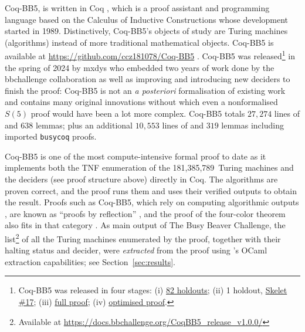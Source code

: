 \documentclass[sigconf,screen]{acmart}
\theoremstyle{definition} %
\numberwithin{equation}{section}
\theoremstyle{definition} %
\newcommand{\BBtheFifthTNF}{181{,}385{,}789}
\newcommand{\CoqBB}{Coq-BB5\xspace}
\begin{document}
\CoqBB, is written in Coq \cite{the_coq_development_team_2024_14542673}, which is a proof assistant and programming language based on the Calculus of Inductive Constructions \cite{CoC} whose development started in 1989. Distinctively, \CoqBB's objects of study are Turing machines (\ie algorithms) instead of more traditional mathematical objects. \CoqBB is available at \url{https://github.com/ccz181078/Coq-BB5} \cite{mxdys_2025_17061968}. \CoqBB was released\footnote{\CoqBB was released in four stages: (i) \href{https://discuss.bbchallenge.org/t/proving-bb-5-in-coq/225}{82 holdouts}; (ii) 1 holdout, \href{https://bbchallenge.org/1RB---_0LC1RE_0LD1LC_1RA1LB_0RB0RA}{Skelet \#17}; (iii) \href{https://discuss.bbchallenge.org/t/july-2nd-2024-we-have-proved-bb-5-47-176-870/237}{full proof}; (iv) \href{https://github.com/ccz181078/Coq-BB5}{optimised proof}.} in the spring of 2024 by mxdys who embedded two years of work done by the bbchallenge collaboration as well as improving and introducing new deciders to finish the proof: \CoqBB is not an \textit{a posteriori} formalisation of existing work and contains many original innovations without which even a nonformalised $S(5)$ proof would have been a lot more complex. \CoqBB totals $27{,}274$ lines of \Coq and $638$ lemmas; plus an additional $10{,}553$ lines of \Coq and $319$ lemmas including imported \texttt{busycoq} proofs.

\CoqBB is one of the most compute-intensive formal proof to date as it implements both the TNF enumeration of the \BBtheFifthTNF\ Turing machines and the deciders (see proof structure above) directly in Coq. The algorithms are proven correct, and the proof runs them and uses their verified outputs to obtain the result. Proofs such as \CoqBB, which rely on computing algorithmic outputs \cite{vmcompute,nativecompute}, are known as ``proofs by reflection'' \cite{boutin1997using}, and the \Coq proof of the four-color theorem also fits in that category \cite{gonthier2010introduction}. As main output of The Busy Beaver Challenge, the list\footnote{Available at \url{https://docs.bbchallenge.org/CoqBB5_release_v1.0.0/}} of all the Turing machines enumerated by the \Coq proof, together with their halting status and decider, were \textit{extracted} from the proof using \Coq's OCaml extraction capabilities; see Section~\ref{sec:results}.

\end{document}

